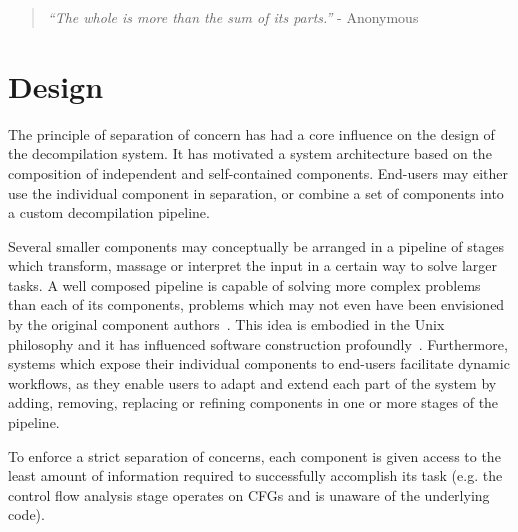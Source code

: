 
%


\begin{quote}
	\textit{``The whole is more than the sum of its parts.''} - Anonymous
\end{quote}

\section{Design}
\label{sec:design}

The principle of separation of concern has had a core influence on the design of the decompilation system. It has motivated a system architecture based on the composition of independent and self-contained components. End-users may either use the individual component in separation, or combine a set of components into a custom decompilation pipeline.

Several smaller components may conceptually be arranged in a pipeline of stages which transform, massage or interpret the input in a certain way to solve larger tasks. A well composed pipeline is capable of solving more complex problems than each of its components, problems which may not even have been envisioned by the original component authors~\cite{simplicity_and_collaboration}. This idea is embodied in the Unix philosophy and it has influenced software construction profoundly~\cite{art_of_unix}. Furthermore, systems which expose their individual components to end-users facilitate dynamic workflows, as they enable users to adapt and extend each part of the system by adding, removing, replacing or refining components in one or more stages of the pipeline.

To enforce a strict separation of concerns, each component is given access to the least amount of information required to successfully accomplish its task (e.g. the control flow analysis stage operates on CFGs and is unaware of the underlying code).

